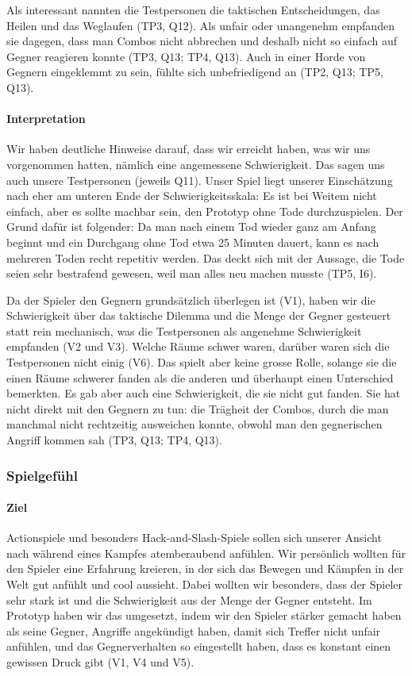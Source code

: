 \documentclass[../Main.tex]{subfiles}
\begin{document}
Als interessant nannten die Testpersonen die taktischen Entscheidungen, das Heilen und das Weglaufen (TP3, Q12). Als unfair oder unangenehm empfanden sie dagegen, dass man Combos nicht abbrechen und deshalb nicht so einfach auf Gegner reagieren konnte (TP3, Q13; TP4, Q13). Auch in einer Horde von Gegnern eingeklemmt zu sein, fühlte sich unbefriedigend an (TP2, Q13; TP5, Q13).

\paragraph{Interpretation}
Wir haben deutliche Hinweise darauf, dass wir erreicht haben, was wir uns vorgenommen hatten, nämlich eine angemessene Schwierigkeit. Das sagen uns auch unsere Testpersonen (jeweils Q11). Unser Spiel liegt unserer Einschätzung nach eher am unteren Ende der Schwierigkeitsskala: Es ist bei Weitem nicht einfach, aber es sollte machbar sein, den Prototyp ohne Tode durchzuspielen. Der Grund dafür ist folgender: Da man nach einem Tod wieder ganz am Anfang beginnt und ein Durchgang ohne Tod etwa 25 Minuten dauert, kann es nach mehreren Toden recht repetitiv werden. Das deckt sich mit der Aussage, die Tode seien sehr bestrafend gewesen, weil man alles neu machen musste (TP5, I6).

Da der Spieler den Gegnern grundsätzlich überlegen ist (V1), haben wir die Schwierigkeit über das taktische Dilemma und die Menge der Gegner gesteuert statt rein mechanisch, was die Testpersonen als angenehme Schwierigkeit empfanden (V2 und V3). Welche Räume schwer waren, darüber waren sich die Testpersonen nicht einig (V6). Das spielt aber keine grosse Rolle, solange sie die einen Räume schwerer fanden als die anderen und überhaupt einen Unterschied bemerkten. Es gab aber auch eine Schwierigkeit, die sie nicht gut fanden. Sie hat nicht direkt mit den Gegnern zu tun: die Trägheit der Combos, durch die man manchmal nicht rechtzeitig ausweichen konnte, obwohl man den gegnerischen Angriff kommen sah (TP3, Q13; TP4, Q13).

\subsubsection{Spielgefühl}

\paragraph{Ziel}
Actionspiele und besonders Hack-and-Slash-Spiele sollen sich unserer Ansicht nach während eines Kampfes atemberaubend anfühlen. Wir persönlich wollten für den Spieler eine Erfahrung kreieren, in der sich das Bewegen und Kämpfen in der Welt gut anfühlt und cool aussieht. Dabei wollten wir besonders, dass der Spieler sehr stark ist und die Schwierigkeit aus der Menge der Gegner entsteht. Im Prototyp haben wir das umgesetzt, indem wir den Spieler stärker gemacht haben als seine Gegner, Angriffe angekündigt haben, damit sich Treffer nicht unfair anfühlen, und das Gegnerverhalten so eingestellt haben, dass es konstant einen gewissen Druck gibt (V1, V4 und V5).
\end{document}
